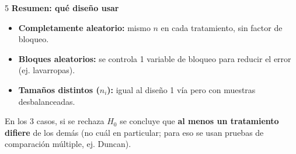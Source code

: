 \documentclass[9pt,a4paper]{article}
\newcommand{\bodysize}{\fontsize{7.5}{8.7}\selectfont}
\newcommand{\subsize}{\fontsize{8.6}{10}\selectfont\bfseries}
\newcommand{\topic}[2]{\subsize\textcolor{#1!60!black}{#2}\par\vspace{0.5pt}\bodysize}
\begin{document}
\begin{multicols}{5}
\topic{green}{Resumen: qué diseño usar}
\begin{itemize}[leftmargin=10pt,itemsep=1pt,topsep=1pt,parsep=0pt]
  \item \textbf{Completamente aleatorio:} mismo $n$ en cada tratamiento, sin factor de bloqueo.
  \item \textbf{Bloques aleatorios:} se controla 1 variable de bloqueo para reducir el error (ej. lavarropas).
  \item \textbf{Tamaños distintos ($n_i$):} igual al diseño 1 vía pero con muestras desbalanceadas.
\end{itemize}
En los 3 casos, si se rechaza $H_0$ se concluye que \textbf{al menos un tratamiento difiere} de los demás (no cuál en particular; para eso se usan pruebas de comparación múltiple, ej. Duncan).

\end{multicols}
\end{document}
